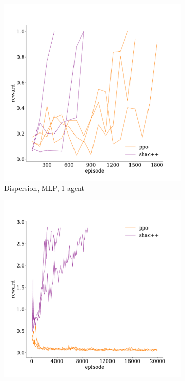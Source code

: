 \newpage
\appendix
\onecolumn

\begin{figure}[t]
    \centering
    \begin{subfigure}[b]{0.32\textwidth}
        \includegraphics[width=\textwidth]{figs/dispersion-1-mlp.pdf}
        \caption{Dispersion, MLP, 1 agent}
        \label{fig:dispersion-mlp-1}
    \end{subfigure}
    \begin{subfigure}[b]{0.32\textwidth}
        \includegraphics[width=\textwidth]{figs/dispersion-3-mlp.pdf}

\end{subfigure}
\end{figure}
